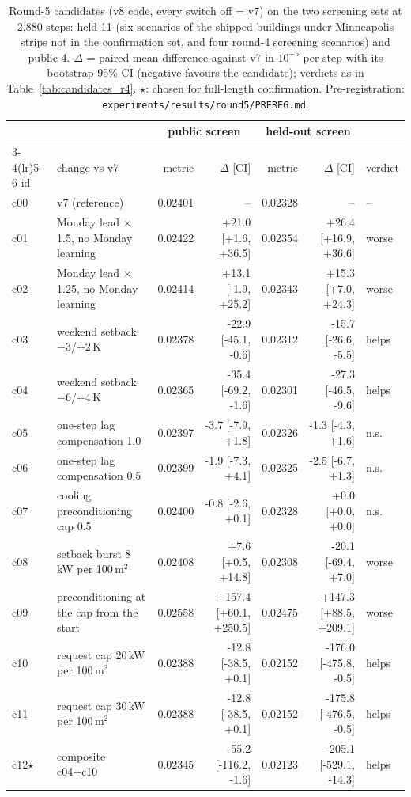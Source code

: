 \begin{table}[!htbp]
\caption{Round-5 candidates (v8 code, every switch off = v7) on the two screening sets at 2,880 steps: held-11 (six scenarios of the shipped buildings under Minneapolis strips not in the confirmation set, and four round-4 screening scenarios) and public-4. $\Delta$ = paired mean difference against v7 in $10^{-5}$ per step with its bootstrap 95\% CI (negative favours the candidate); verdicts as in Table~\ref{tab:candidates_r4}. $\star$: chosen for full-length confirmation. Pre-registration: \texttt{experiments/results/round5/PREREG.md}.}
\label{tab:candidates_r5}
\centering\scriptsize
\setlength{\tabcolsep}{2.2pt}
\begin{tabular}{llrrrrl}
\toprule
 & & \multicolumn{2}{c}{public screen} & \multicolumn{2}{c}{held-out screen} & \\
\cmidrule(lr){3-4}\cmidrule(lr){5-6}
id & change vs v7 & metric & $\Delta$ [CI] & metric & $\Delta$ [CI] & verdict \\
\midrule
c00 & v7 (reference) & 0.02401 & -- & 0.02328 & -- & -- \\
c01 & Monday lead $\times$1.5, no Monday learning & 0.02422 & +21.0 [+1.6, +36.5] & 0.02354 & +26.4 [+16.9, +36.6] & worse \\
c02 & Monday lead $\times$1.25, no Monday learning & 0.02414 & +13.1 [-1.9, +25.2] & 0.02343 & +15.3 [+7.0, +24.3] & worse \\
c03 & weekend setback $-3$/$+2$\,K & 0.02378 & -22.9 [-45.1, -0.6] & 0.02312 & -15.7 [-26.6, -5.5] & helps \\
c04 & weekend setback $-6$/$+4$\,K & 0.02365 & -35.4 [-69.2, -1.6] & 0.02301 & -27.3 [-46.5, -9.6] & helps \\
c05 & one-step lag compensation 1.0 & 0.02397 & -3.7 [-7.9, +1.8] & 0.02326 & -1.3 [-4.3, +1.6] & n.s. \\
c06 & one-step lag compensation 0.5 & 0.02399 & -1.9 [-7.3, +4.1] & 0.02325 & -2.5 [-6.7, +1.3] & n.s. \\
c07 & cooling preconditioning cap 0.5 & 0.02400 & -0.8 [-2.6, +0.1] & 0.02328 & +0.0 [+0.0, +0.0] & n.s. \\
c08 & setback burst 8\,kW per 100\,m$^2$ & 0.02408 & +7.6 [+0.5, +14.8] & 0.02308 & -20.1 [-69.4, +7.0] & worse \\
c09 & preconditioning at the cap from the start & 0.02558 & +157.4 [+60.1, +250.5] & 0.02475 & +147.3 [+88.5, +209.1] & worse \\
c10 & request cap 20\,kW per 100\,m$^2$ & 0.02388 & -12.8 [-38.5, +0.1] & 0.02152 & -176.0 [-475.8, -0.5] & helps \\
c11 & request cap 30\,kW per 100\,m$^2$ & 0.02388 & -12.8 [-38.5, +0.1] & 0.02152 & -175.8 [-476.5, -0.5] & helps \\
c12$\star$ & composite c04+c10 & 0.02345 & -55.2 [-116.2, -1.6] & 0.02123 & -205.1 [-529.1, -14.3] & helps \\
\bottomrule
\end{tabular}
\end{table}
